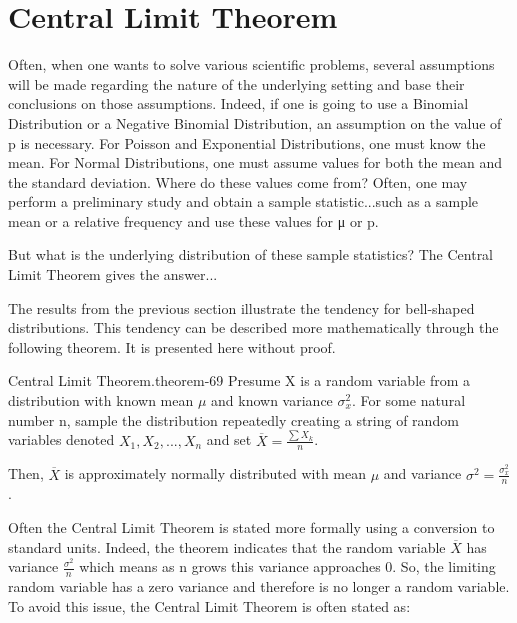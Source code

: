 \documentclass[10pt,]{book}
\numberwithin{equation}{section}
\begin{document}
\section[{Central Limit Theorem}]{Central Limit Theorem}\label{section-62}
\hypertarget{p-1272}{}%
Often, when one wants to solve various scientific problems, several assumptions will be made regarding the nature of the underlying setting and base their conclusions on those assumptions.  Indeed, if one is going to use a Binomial Distribution or a Negative Binomial Distribution, an assumption on the value of p is necessary.  For Poisson and Exponential Distributions, one must know the mean.  For Normal Distributions, one must assume values for both the mean and the standard deviation.   Where do these values come from?  Often, one may perform a preliminary study and obtain a sample statistic...such as a sample mean or a relative frequency and use these values for μ or p.%
\par
\hypertarget{p-1273}{}%
But what is the underlying distribution of these sample statistics?  The Central Limit Theorem gives the answer...%
\par
\hypertarget{p-1274}{}%
The results from the previous section illustrate the tendency for bell-shaped distributions. This tendency can be described more mathematically through the following theorem. It is presented here without proof.%
\par
\hypertarget{p-1275}{}%
\begin{theorem}{Central Limit Theorem.}{}{theorem-69}%
\hypertarget{p-1276}{}%
Presume X is a random variable from a distribution with known mean \(\mu\) and known variance \(\sigma_x^2\). For some natural number n, sample the distribution repeatedly creating a string of random variables denoted \(X_1, X_2, ... , X_n\) and set \(\overline{X} = \frac{\sum X_k}{n}\).%
\par
\hypertarget{p-1277}{}%
Then, \(\overline{X}\) is approximately normally distributed with mean \(\mu\) and variance \(\sigma^2 = \frac{\sigma_x^2}{n}\).%
\end{theorem}
%
\par
\hypertarget{p-1278}{}%
Often the Central Limit Theorem is stated more formally using a conversion to standard units. Indeed, the theorem indicates that the random variable \(\overline{X}\) has variance \(\frac{\sigma^2}{n}\) which means as n grows this variance approaches 0. So, the limiting random variable has a zero variance and therefore is no longer a random variable. To avoid this issue, the Central Limit Theorem is often stated as:%
\end{document}
